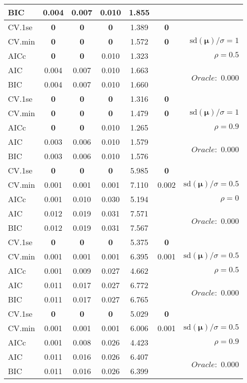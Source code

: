 \begin{table}
\begin{center}
\begin{tabular}{l*{5}{c}|r}
BIC & 0.004 & 0.007 & 0.010 & 1.855 & &  \\
 \hline 
CV.1se & {\bf 0} & {\bf 0} & {\bf 0} & 1.389 & {\bf 0} & \\
CV.min & {\bf 0} & {\bf 0} & {\bf 0} & 1.572 & {\bf 0} &  $\mathrm{sd}(\mathbf{\mu})/\sigma=1$ \\
AICc & {\bf 0} & {\bf 0} & 0.010 & 1.323 & & $\rho=0.5$ \\
AIC & 0.004 & 0.007 & 0.010 & 1.663 & &  \multirow{2}{*}{$Oracle: $ 0.000} \\
BIC & 0.004 & 0.007 & 0.010 & 1.660 & &  \\
 \hline 
CV.1se & {\bf 0} & {\bf 0} & {\bf 0} & 1.316 & {\bf 0} & \\
CV.min & {\bf 0} & {\bf 0} & {\bf 0} & 1.479 & {\bf 0} &  $\mathrm{sd}(\mathbf{\mu})/\sigma=1$ \\
AICc & {\bf 0} & {\bf 0} & 0.010 & 1.265 & & $\rho=0.9$ \\
AIC & 0.003 & 0.006 & 0.010 & 1.579 & &  \multirow{2}{*}{$Oracle: $ 0.000} \\
BIC & 0.003 & 0.006 & 0.010 & 1.576 & &  \\
 \hline 
CV.1se & {\bf 0} & {\bf 0} & {\bf 0} & 5.985 & {\bf 0} & \\
CV.min & 0.001 & 0.001 & 0.001 & 7.110 & 0.002 &  $\mathrm{sd}(\mathbf{\mu})/\sigma=0.5$ \\
AICc & 0.001 & 0.010 & 0.030 & 5.194 & & $\rho=0$ \\
AIC & 0.012 & 0.019 & 0.031 & 7.571 & &  \multirow{2}{*}{$Oracle: $ 0.000} \\
BIC & 0.012 & 0.019 & 0.031 & 7.567 & &  \\
 \hline 
CV.1se & {\bf 0} & {\bf 0} & {\bf 0} & 5.375 & {\bf 0} & \\
CV.min & 0.001 & 0.001 & 0.001 & 6.395 & 0.001 &  $\mathrm{sd}(\mathbf{\mu})/\sigma=0.5$ \\
AICc & 0.001 & 0.009 & 0.027 & 4.662 & & $\rho=0.5$ \\
AIC & 0.011 & 0.017 & 0.027 & 6.772 & &  \multirow{2}{*}{$Oracle: $ 0.000} \\
BIC & 0.011 & 0.017 & 0.027 & 6.765 & &  \\
 \hline 
CV.1se & {\bf 0} & {\bf 0} & {\bf 0} & 5.029 & {\bf 0} & \\
CV.min & 0.001 & 0.001 & 0.001 & 6.006 & 0.001 &  $\mathrm{sd}(\mathbf{\mu})/\sigma=0.5$ \\
AICc & 0.001 & 0.008 & 0.026 & 4.423 & & $\rho=0.9$ \\
AIC & 0.011 & 0.016 & 0.026 & 6.407 & &  \multirow{2}{*}{$Oracle: $ 0.000} \\
BIC & 0.011 & 0.016 & 0.026 & 6.399 & &  \\
 \hline 
\end{tabular}
\end{center}
\vspace{-1cm}
\end{table}




